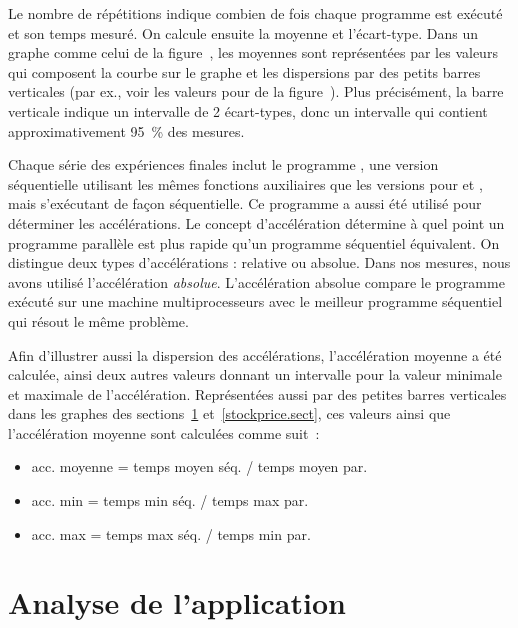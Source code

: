 Le nombre de r\'ep\'etitions indique combien de fois chaque programme est exécuté et son temps mesuré.
%
On calcule ensuite la moyenne et l'écart-type. Dans un graphe comme celui de la figure~, les moyennes sont repr\'esent\'ees par les valeurs qui composent la courbe sur le graphe et les dispersions par des petits barres verticales (par ex., voir les valeurs pour 
de la figure~). Plus précisément, la barre verticale indique un intervalle de 2 écart-types, donc un intervalle qui contient approximativement 95~\% des mesures.

Chaque s\'erie des exp\'eriences finales inclut le programme , une version s\'equentielle utilisant les m\^emes fonctions auxiliaires que les versions pour  et , mais s'ex\'ecutant de fa\c con s\'equentielle. Ce programme a aussi \'et\'e utilis\'e pour d\'eterminer les acc\'el\'erations. Le concept d'acc\'el\'eration d\'etermine \`a quel point un programme parall\`ele est plus rapide qu'un programme s\'equentiel \'equivalent. On distingue deux types d'acc\'elérations : relative ou absolue. Dans nos mesures, nous avons utilis\'e l'acc\'el\'eration \emph{absolue}. L'acc\'el\'eration absolue compare le programme ex\'ecut\'e sur une machine multiprocesseurs avec le meilleur programme s\'equentiel qui r\'esout le m\^eme probl\`eme. 

Afin d'illustrer aussi la dispersion des acc\'el\'erations, l'accélération moyenne a été calculée, ainsi deux autres valeurs donnant un intervalle pour la valeur minimale et maximale de l'acc\'el\'eration. Repr\'esent\'ees aussi par des petites barres verticales dans les graphes des sections~\ref{wordcount.sect} et~\ref{stockprice.sect}, ces valeurs ainsi que l'accélération moyenne sont calcul\'ees comme suit~: 

\begin{itemize}
\item acc. moyenne  =  temps moyen séq. / temps moyen par.
\item acc. min  =  temps min séq. / temps max par.
\item acc. max = temps max séq. / temps min par.
\end{itemize}

\section{Analyse de l'application }
\label{wordcount.sect}



